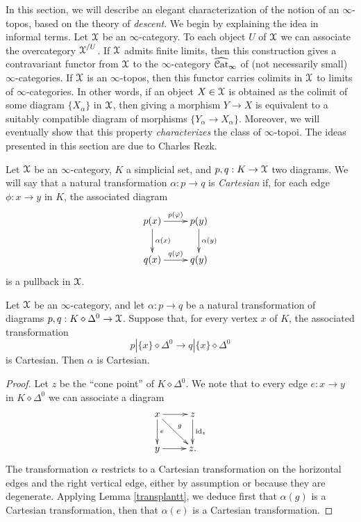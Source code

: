 In this section, we will describe an elegant characterization of the notion of an $\infty$-topos, based on the theory of {\em descent}. We begin by explaining the idea in informal terms.
Let $\operatorname{\mathcal{X}}$ be an $\infty$-category. To each object $U$ of $\operatorname{\mathcal{X}}$ we can associate
the overcategory $\operatorname{\mathcal{X}}^{/U}$. If $\operatorname{\mathcal{X}}$ admits finite limits, then this construction gives a contravariant functor from $\operatorname{\mathcal{X}}$ to the $\infty$-category
$\widehat{ \operatorname{\mathcal{C}at}}_{\infty}$ of (not necessarily small) $\infty$-categories. If $\operatorname{\mathcal{X}}$ is an $\infty$-topos, then this functor carries colimits in $\operatorname{\mathcal{X}}$ to limits of $\infty$-categories. In other words, if an object $X \in \operatorname{\mathcal{X}}$ is obtained as the colimit of some diagram $\{ X_{\alpha} \}$ in $\operatorname{\mathcal{X}}$, then giving a morphism $Y \rightarrow X$ is equivalent to a suitably compatible diagram of morphisms
$\{ Y_{\alpha} \rightarrow X_{\alpha} \}$. Moreover, we will eventually show that this property {\em characterizes} the class of $\infty$-topoi. The ideas presented in this section are due to Charles Rezk.

\begin{definition}
Let $\operatorname{\mathcal{X}}$ be an $\infty$-category, $K$ a simplicial set, and $p,q: K \rightarrow \operatorname{\mathcal{X}}$
two diagrams. We will say that a natural transformation $\alpha: p \rightarrow q$ is
{\it Cartesian} if, for each edge $\phi: x \rightarrow y$ in $K$, the associated diagram
$$ \xymatrix{ p(x) \ar[r]^{p(\phi)} \ar[d]^{\alpha(x)} & p(y) \ar[d]^{\alpha(y)} \\
q(x) \ar[r]^{q(\phi)} & q(y) }$$
is a pullback in $\operatorname{\mathcal{X}}$. 
\end{definition}

\begin{lemma}\label{ib0}
Let $\operatorname{\mathcal{X}}$ be an $\infty$-category, and 
let $\alpha: p \rightarrow q$ be a natural transformation of diagrams
$p,q: K \diamond \Delta^0 \rightarrow \operatorname{\mathcal{X}}$. Suppose that, for every vertex
$x$ of $K$, the associated transformation
$$ p | \{x\} \diamond \Delta^0 \rightarrow q| \{x\} \diamond \Delta^0 $$
is Cartesian. Then $\alpha$ is Cartesian.
\end{lemma}

\begin{proof}
Let $z$ be the ``cone point'' of $K \diamond \Delta^0$. We note that to every
edge $e: x \rightarrow y$ in $K \diamond \Delta^0$ we can associate a diagram
$$ \xymatrix{ x \ar[d]^{e} \ar[r] \ar[dr]^{g} & z \ar[d]^{\id_{z}} \\
y \ar[r] & z. }$$
The transformation $\alpha$ restricts to a Cartesian transformation on the horizontal edges and the right vertical edge, either by assumption or because they are degenerate. Applying Lemma \ref{transplantt}, we deduce first that $\alpha(g)$ is a Cartesian transformation, then that
$\alpha(e)$ is a Cartesian transformation.
\end{proof}

